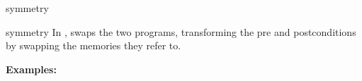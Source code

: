 \begin{tactic}{symmetry}
  \begin{tsyntax}{symmetry}
  In \prhl, swaps the two programs, transforming the pre and
  postconditions by swapping the memories they refer to.

  \textbf{Examples:}
  \end{tsyntax}
\end{tactic}
